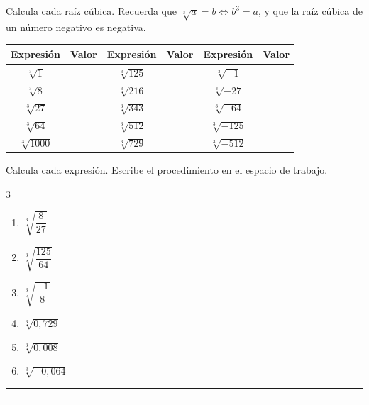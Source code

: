 \documentclass[11pt, letterpaper]{article}
\newcommand{\espacio}[1]{%
  \par\vspace{5pt}%
  \noindent\textcolor{zenitnavy!22}{\rule{\linewidth}{1.2pt}}%
  \par\vspace{#1}%
  \noindent\textcolor{zenitnavy!22}{\rule{\linewidth}{1.2pt}}%
  \par\vspace{5pt}%
  \noindent{\small\textbf{Respuesta:}\;\rule{7cm}{0.35pt}}%
  \par\vspace{2mm}}
\begin{document}
\begin{tcolorbox}[ejbasico,
  title={Ejercicio 11 \hfill $\bigstar$ \quad Cubos perfectos}]

Calcula cada raíz cúbica. Recuerda que $\sqrt[3]{a}=b\Leftrightarrow b^3=a$, y que la raíz cúbica de un número negativo es negativa.

\medskip

\begin{center}
\renewcommand{\arraystretch}{1.9}
\begin{tabular}{|c|c||c|c||c|c|}
\hline
\textbf{Expresión} & \textbf{Valor} & \textbf{Expresión} & \textbf{Valor} & \textbf{Expresión} & \textbf{Valor}\\
\hline
$\sqrt[3]{1}$    & & $\sqrt[3]{125}$  & & $\sqrt[3]{-1}$   &\\
\hline
$\sqrt[3]{8}$    & & $\sqrt[3]{216}$  & & $\sqrt[3]{-27}$  &\\
\hline
$\sqrt[3]{27}$   & & $\sqrt[3]{343}$  & & $\sqrt[3]{-64}$  &\\
\hline
$\sqrt[3]{64}$   & & $\sqrt[3]{512}$  & & $\sqrt[3]{-125}$ &\\
\hline
$\sqrt[3]{1000}$ & & $\sqrt[3]{729}$  & & $\sqrt[3]{-512}$ &\\
\hline
\end{tabular}
\end{center}
\end{tcolorbox}

\vspace{6pt}

\begin{tcolorbox}[ejbasico,
  title={Ejercicio 12 \hfill $\bigstar$ \quad Raíces cúbicas de fracciones y decimales}]

Calcula cada expresión. Escribe el procedimiento en el espacio de trabajo.

\medskip

\begin{multicols}{3}
\begin{enumerate}[label=\alph*), leftmargin=*]
  \item $\sqrt[3]{\dfrac{8}{27}}$
  \item $\sqrt[3]{\dfrac{125}{64}}$
  \item $\sqrt[3]{\dfrac{-1}{8}}$
  \item $\sqrt[3]{0{,}729}$
  \item $\sqrt[3]{0{,}008}$
  \item $\sqrt[3]{-0{,}064}$
\end{enumerate}
\end{multicols}

\espacio{5.5cm}
\end{tcolorbox}
\end{document}
